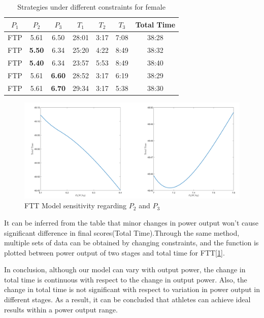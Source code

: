 \begin{table}[h]
	\setlength\tabcolsep{13pt}%
	\setlength{\belowcaptionskip}{0.2cm}
	\centering
	\caption{Strategies under different constraints for female}
	\begin{tabular}{ccc|cccc}
		\toprule[2pt]
		$P_1$    & $P_2$    & $P_3$    & $T_1$    & $T_2$    & $T_3$    & Total Time \\
		\midrule
FTP   & 5.61  & 6.50  & 28:01 & 3:17  & 7:08  & 38:28 \\
FTP   & \textbf{5.50 } & 6.34  & 25:20 & 4:22  & 8:49  & 38:32 \\
FTP   & \textbf{5.40 } & 6.34  & 23:57 & 5:53  & 8:49  & 38:40 \\
FTP   & 5.61  & \textbf{6.60 } & 28:52 & 3:17  & 6:19  & 38:29 \\
FTP   & 5.61  & \textbf{6.70 } & 29:34 & 3:17  & 5:38  & 38:30 \\
	\bottomrule[2pt]
\end{tabular}%
\label{time3}%
\end{table}%
\begin{figure}[h]
	\centering
	\includegraphics[width=0.7\linewidth]{image/p1}
	\caption{FTT Model sensitivity regarding $P_2$ and $P_3$}
	\label{P2}
\end{figure}

\par It can be inferred from the table that minor changes in power output won't cause significant difference in final scores(Total Time).Through the same method, multiple sets of data can be obtained by changing constraints, and the function is plotted between power output of two stages and total time  for FTT[\ref{P2}]. 
\par In conclusion, although our model can vary with output power, the change in total time is continuous with respect to the change in output power. Also, the change in total time is not significant with respect to variation in power output in different stages. As a result, it can be concluded that athletes can achieve ideal results within a power output range.

